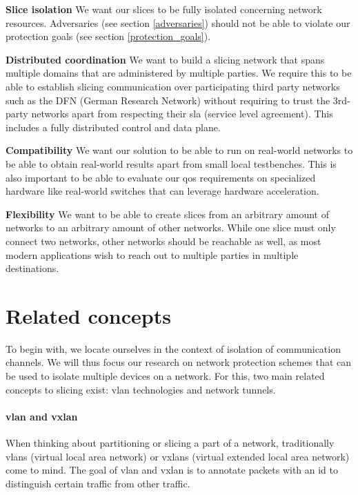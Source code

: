 \begin{description}[style=multiline, labelwidth=0.7cm]
    \item[\namedlabel{R1}{R1}] \textbf{Slice isolation} We want our slices to be fully isolated concerning network resources. Adversaries (see section \ref{adversaries}) should not be able to violate our protection goals (see section \ref{protection_goals}).
    \item[\namedlabel{R2}{R2}] \textbf{Distributed coordination} We want to build a slicing network that spans multiple domains that are administered by multiple parties. We require this to be able to establish slicing communication over participating third party networks such as the DFN (German Research Network) without requiring to trust the 3rd-party networks apart from respecting their \acrshort{sla} (service level agreement). This includes a fully distributed control and data plane.
    \item[\namedlabel{R3}{R3}] \textbf{Compatibility} We want our solution to be able to run on real-world networks to be able to obtain real-world results apart from small local testbenches. This is also important to be able to evaluate our \acrshort{qos} requirements on specialized hardware like real-world switches that can leverage hardware acceleration.
    \item[\namedlabel{R4}{R4}] \textbf{Flexibility} We want to be able to create slices from an arbitrary amount of networks to an arbitrary amount of other networks. While one slice must only connect two networks, other networks should be reachable as well, as most modern applications wish to reach out to multiple parties in multiple destinations.
\end{description}


\section{Related concepts}
To begin with, we locate ourselves in the context of isolation of communication channels. We will thus focus our research on network protection schemes that can be used to isolate multiple devices on a network. For this, two main related concepts to slicing exist: \acrshort{vlan} technologies and network tunnels.

\paragraph{\acrshort{vlan} and \acrshort{vxlan}} When thinking about partitioning or slicing a part of a network, traditionally \acrshort{vlan}s (virtual local area network) \cite{IEEE8021Q} or \acrshort{vxlan}s (virtual extended local area network) \cite{rfc7348} come to mind. The goal of \acrshort{vlan} and \acrshort{vxlan} is to annotate packets with an id to distinguish certain traffic from other traffic.

